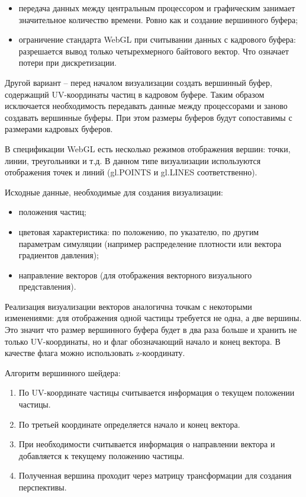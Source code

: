 \begin{itemize}
  \item передача данных между центральным процессором и графическим занимает значительное
    количество времени. Ровно как и создание вершинного буфера;
  \item ограничение стандарта WebGL при считывании данных с кадрового буфера: разрешается
    вывод только четырехмерного байтового вектор. Что означает потери при дискретизации.
\end{itemize}

Другой вариант -- перед началом визуализации создать вершинный буфер, содержащий UV-координаты
частиц в кадровом буфере. Таким образом исключается необходимость передавать данные
между процессорами и заново создавать вершинные буферы. При этом размеры буферов будут
сопоставимы с размерами кадровых буферов.

В спецификации WebGL есть несколько режимов отображения вершин: точки, линии, треугольники и т.д.
В данном типе визуализации используются отображения точек и линий (gl.POINTS и gl.LINES соответственно).

Исходные данные, необходимые для создания визуализации:

\begin{itemize}
  \item положения частиц;
  \item цветовая характеристика: по положению, по указателю, по другим параметрам симуляции 
    (например распределение плотности или вектора градиентов давления);
  \item направление векторов (для отображения векторного визуального представления).
\end{itemize}

Реализация визуализации векторов аналогична точкам с некоторыми изменениями: для отображения
одной частицы требуется не одна, а две вершины. Это значит что размер вершинного буфера
будет в два раза больше и хранить не только UV-координаты, но и флаг обозначающий начало
и конец вектора. В качестве флага можно использовать z-координату.

Алгоритм вершинного шейдера:

\begin{enumerate}
  \item По UV-координате частицы считывается информация о текущем положении частицы.
  \item По третьей координате определяется начало и конец вектора.
  \item При необходимости считывается информация о направлении вектора и добавляется к
    текущему положению частицы.
  \item Полученная вершина проходит через матрицу трансформации для создания перспективы.
\end{enumerate}

